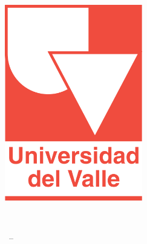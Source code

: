 
\begin{titlepage}

\begin{addmargin}[-1cm]{-3cm}
\begin{center}
\large

\hfill
\vfill

\begingroup
\color{Maroon}\spacedallcaps{\myTitle} \\ \bigskip %
\endgroup

\spacedlowsmallcaps{\myName} %

\vfill

\includegraphics[width=6cm]{gfx/universidadDelValle.png} \\ \medskip %

\mySubtitle \\ \medskip %

\myTime\ -- \myVersion %

\vfill

\end{center}
\end{addmargin}

\end{titlepage}